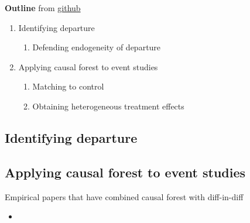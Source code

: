 \documentclass[source/paper/main.tex]{subfiles}
\begin{document}
\textbf{Outline} from \href{https://github.com/liaochris/oss_hierarchy/issues/2#issuecomment-2589020215}{github}
\begin{enumerate}
    \item Identifying departure
        \begin{enumerate}
            \item Defending endogeneity of departure
        \end{enumerate}
    \item Applying causal forest to event studies
    \begin{enumerate}
        \item Matching to control
        \item Obtaining heterogeneous treatment effects
    \end{enumerate}
\end{enumerate}

\subsection{Identifying departure}

\subsection{Applying causal forest to event studies}
Empirical papers that have combined causal forest with diff-in-diff
\begin{itemize}
    \item 
\end{itemize}
\end{document}

